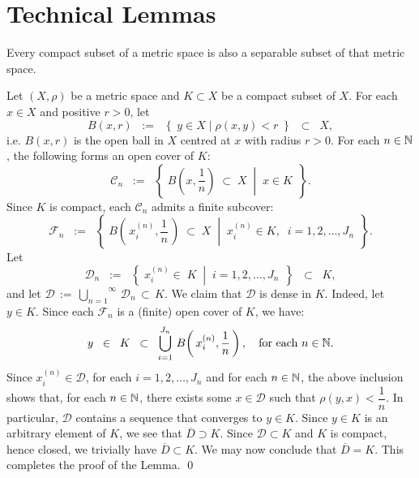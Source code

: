 

\section{Technical Lemmas}
\setcounter{theorem}{0}
\setcounter{equation}{0}

\renewcommand{\theenumi}{\roman{enumi}}
\renewcommand{\labelenumi}{\textnormal{(\theenumi)}$\;\;$}

\begin{lemma}\label{lemma:CompactImpliesSeparable}
\mbox{}
\vskip 0.3cm
\noindent
Every compact subset of a metric space is also a separable subset of that metric space.
\end{lemma}
\proof
Let $(X,\rho)$ be a metric space and $K \subset X$ be a compact subset of $X$.
For each $x \in X$ and positive $r > 0$, let
\begin{equation*}
B(x,r)
\;\; := \;\; \left\{\;y \in X \;\vert\; \rho(x,y) < r \;\right\}
\;\;\subset\;\; X,
\end{equation*}
i.e. $B(x,r)$ is the open ball in $X$ centred at $x$ with radius $r > 0$.
For each $n \in \mathbb{N}$, the following forms an open cover of $K$:
\begin{equation*}
\mathcal{C}_{n}
\;\; := \;\;
\left\{\;
\left.
B\!\left(x,\dfrac{1}{n}\right) \;\subset\; X
\;\;\right\vert\;\;
x \in K
\,\;\right\}.
\end{equation*}
Since $K$ is compact, each $\mathcal{C}_{n}$ admits a finite subcover:
\begin{equation*}
\mathcal{F}_{n}
\;\; := \;\;
\left\{\;
\left.
B\!\left(\,x^{(n)}_{i},\dfrac{1}{n}\,\right) \;\subset\; X
\;\;\right\vert\;\;
x^{(n)}_{i} \in K,\;\;
i = 1, 2, \ldots, J_{n}
\,\;\right\}.
\end{equation*}
Let
\begin{equation*}
\mathcal{D}_{n}
\;\; := \;\;
\left\{\;
\left.
x^{(n)}_{i} \in\; K
\;\;\right\vert\;\;
i = 1, 2, \ldots, J_{n}
\,\;\right\}
\;\; \subset \;\; K,
\end{equation*}
and let $\mathcal{D} \,:=\, \overset{\infty}{\underset{n=1}{\bigcup}}\,\mathcal{D}_{n} \,\subset\, K$.
We claim that $\mathcal{D}$ is dense in $K$.
Indeed, let $y \in K$. Since each $\mathcal{F}_{n}$ is a (finite) open cover of $K$, we have:
\begin{equation*}
y \;\; \in \;\; K \;\; \subset \;\; \bigcup_{i=1}^{J_{n}}\,B\!\left(\,x^{(n)}_{i},\dfrac{1}{n}\,\right),
\quad
\textnormal{for each $n \in \mathbb{N}$}.
\end{equation*}
Since $x^{(n)}_{i} \in \mathcal{D}$, for each $i = 1, 2, \ldots, J_{n}$ and for each $n \in \mathbb{N}$,
the above inclusion shows that, for each $n \in \mathbb{N}$, there exists some $x \in \mathcal{D}$ such that $\rho(y,x) < \dfrac{1}{n}$.
In particular, $\mathcal{D}$ contains a sequence that converges to $y \in K$.
Since $y \in K$ is an arbitrary element of $K$, we see that $\overline{D} \supset K$.
Since $\mathcal{D} \subset K$ and $K$ is compact, hence closed, we trivially have $\overline{D} \subset K$.
We may now conclude that $\overline{D} = K$.
This completes the proof of the Lemma.
\qed

